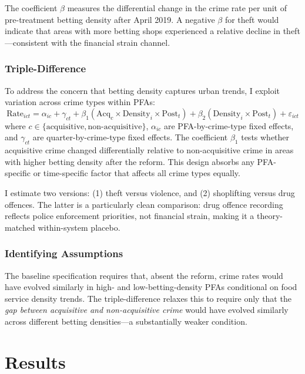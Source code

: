 \documentclass[12pt]{article}
\begin{document}
The coefficient $\beta$ measures the differential change in the crime rate per unit of pre-treatment betting density after April 2019. A negative $\beta$ for theft would indicate that areas with more betting shops experienced a relative decline in theft---consistent with the financial strain channel.

\subsubsection*{Triple-Difference} To address the concern that betting density captures urban trends, I exploit variation across crime types within PFAs:
\begin{equation}
\text{Rate}_{ict} = \alpha_{ic} + \gamma_{ct} + \beta_1 (\text{Acq}_c \times \text{Density}_i \times \text{Post}_t) + \beta_2 (\text{Density}_i \times \text{Post}_t) + \varepsilon_{ict}
\label{eq:triple}
\end{equation}
where $c \in \{\text{acquisitive}, \text{non-acquisitive}\}$, $\alpha_{ic}$ are PFA-by-crime-type fixed effects, and $\gamma_{ct}$ are quarter-by-crime-type fixed effects. The coefficient $\beta_1$ tests whether acquisitive crime changed differentially relative to non-acquisitive crime in areas with higher betting density after the reform. This design absorbs any PFA-specific or time-specific factor that affects all crime types equally.

I estimate two versions: (1) theft versus violence, and (2) shoplifting versus drug offences. The latter is a particularly clean comparison: drug offence recording reflects police enforcement priorities, not financial strain, making it a theory-matched within-system placebo.

\subsubsection*{Identifying Assumptions} The baseline specification requires that, absent the reform, crime rates would have evolved similarly in high- and low-betting-density PFAs conditional on food service density trends. The triple-difference relaxes this to require only that the \textit{gap between acquisitive and non-acquisitive crime} would have evolved similarly across different betting densities---a substantially weaker condition.


\section{Results}
\end{document}
